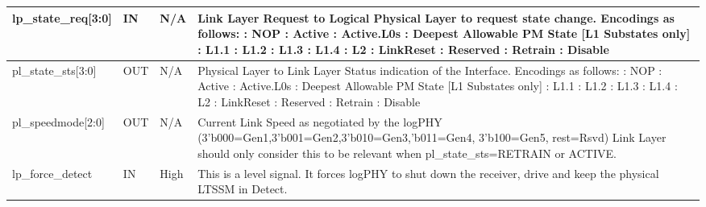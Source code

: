 \begin{table}[H]

    \centering
  \begin{tabular}{ |P{26mm}|P{5mm}|P{10mm} | m{60mm}|  }
  \hline

\hline
lp\_state\_req[3:0] & IN & N/A & 
Link Layer Request to Logical Physical Layer to request state change.
Encodings as follows: : NOP : Active : Active.L0s : Deepest Allowable PM State [L1 Substates only] : L1.1 : L1.2 : L1.3 : L1.4 : L2 : LinkReset : Reserved : Retrain : Disable \newline 
\\ \hline
pl\_state\_sts[3:0] & OUT & N/A &
Physical Layer to Link Layer Status indication of the Interface.
Encodings as follows:
: NOP : Active : Active.L0s : Deepest Allowable PM State [L1 Substates only] : L1.1 : L1.2 : L1.3 : L1.4 : L2 : LinkReset : Reserved : Retrain : Disable \newline
\\ \hline
pl\_speedmode[2:0] & OUT & N/A & Current Link Speed as negotiated by the logPHY
(3’b000=Gen1,3’b001=Gen2,3’b010=Gen3,’b011=Gen4, 3’b100=Gen5, rest=Rsvd)
Link Layer should only consider this to be relevant when pl\_state\_sts=RETRAIN or
ACTIVE. \\ \hline
lp\_force\_detect & IN & High & This is a level signal. It forces logPHY to shut down the receiver, drive and keep the
physical LTSSM in Detect. \\ \hline
\end{tabular}
\end{table}



